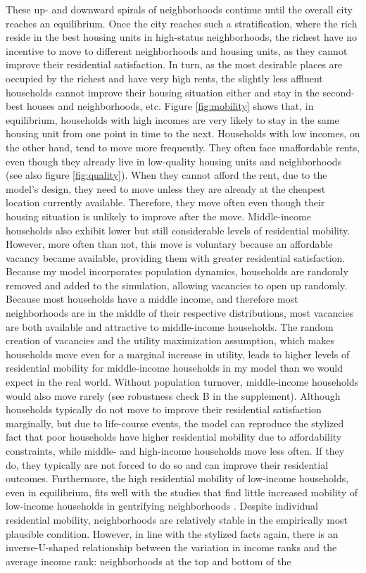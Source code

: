 These up- and downward spirals of neighborhoods continue until the overall city reaches an equilibrium. Once the city reaches such a stratification, where the rich reside in the best housing units in high-status neighborhoods, the richest have no incentive to move to different neighborhoods and housing units, as they cannot improve their residential satisfaction. In turn, as the most desirable places are occupied by the richest and have very high rents, the slightly less affluent households cannot improve their housing situation either and stay in the second-best houses and neighborhoods, etc. Figure \ref{fig:mobility} shows that, in equilibrium, households with high incomes are very likely to stay in the same housing unit from one point in time to the next. Households with low incomes, on the other hand, tend to move more frequently. They often face unaffordable rents, even though they already live in low-quality housing units and neighborhoods (see also figure \ref{fig:quality}). When they cannot afford the rent, due to the model's design, they need to move unless they are already at the cheapest location currently available. Therefore, they move often even though their housing situation is unlikely to improve after the move. Middle-income households also exhibit lower but still considerable levels of residential mobility. However, more often than not, this move is voluntary because an affordable vacancy became available, providing them with greater residential satisfaction. Because my model incorporates population dynamics, households are randomly removed and added to the simulation, allowing vacancies to open up randomly. Because most households have a middle income, and therefore most neighborhoods are in the middle of their respective distributions, most vacancies are both available and attractive to middle-income households. The random creation of vacancies and the utility maximization assumption, which makes households move even for a marginal increase in utility, leads to higher levels of residential mobility for middle-income households in my model than we would expect in the real world. Without population turnover, middle-income households would also move rarely (see robustness check B in the supplement). Although households typically do not move to improve their residential satisfaction marginally, but due to life-course events, the model can reproduce the stylized fact that poor households have higher residential mobility due to affordability constraints, while middle- and high-income households move less often. If they do, they typically are not forced to do so and can improve their residential outcomes. Furthermore, the high residential mobility of low-income households, even in equilibrium, fits well with the studies that find little increased mobility of low-income households in gentrifying neighborhoods \citep{freemanDisplacementSuccessionResidential2005, dingGentrificationResidentialMobility2016, leeGeographyGentrificationResidential2023}. Despite individual residential mobility, neighborhoods are relatively stable in the empirically most plausible condition. However, in line with the stylized facts again, there is an inverse-U-shaped relationship between the variation in income ranks and the average income rank: neighborhoods at the top and bottom of the 